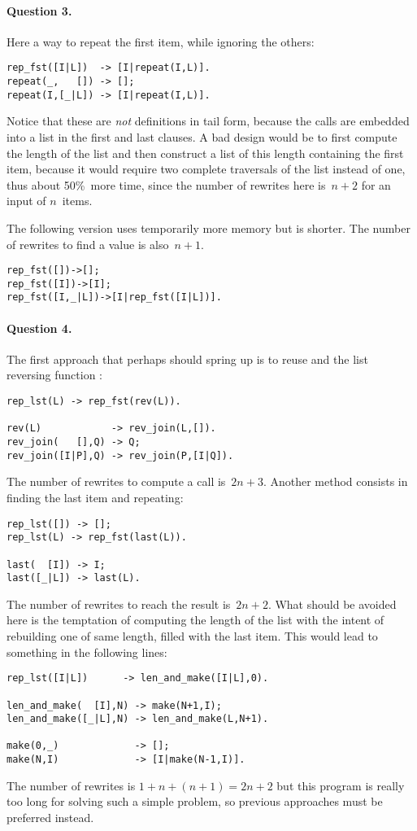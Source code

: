 \medskip

\paragraph{Question 3.}

Here a way to repeat the first item, while ignoring the others:
\begin{verbatim}
rep_fst([I|L])  -> [I|repeat(I,L)].
repeat(_,   []) -> [];
repeat(I,[_|L]) -> [I|repeat(I,L)].
\end{verbatim}
Notice that these are \emph{not} definitions in tail form, because the
calls  are embedded into a list in the first and
last clauses. A bad design would be to first compute the length of the
list and then construct a list of this length containing the first
item, because it would require two complete traversals of the list
instead of one, thus about 50\%~more time, since the number of
rewrites here is~\(n+2\) for an input of \(n\)~items.

The following version uses temporarily more memory but is shorter.
The number of rewrites to find a value is also~\(n+1\).
\begin{alltt}
rep_fst(     []) -> [];
rep_fst(    [I]) -> [I];
rep_fst([I,_|L]) -> [I|rep_fst([I|L])].\hfill% \emph{Two} | \emph{instead of 1}
\end{alltt}

\medskip

\paragraph{Question 4.}

The first approach that perhaps should spring up is to reuse
 and the list reversing function :
\begin{verbatim}
rep_lst(L) -> rep_fst(rev(L)).

rev(L)            -> rev_join(L,[]).
rev_join(   [],Q) -> Q;
rev_join([I|P],Q) -> rev_join(P,[I|Q]).
\end{verbatim}
The number of rewrites to compute a call is~\(2n+3\). Another method
consists in finding the last item and repeating:
\begin{verbatim}
rep_lst([]) -> [];
rep_lst(L) -> rep_fst(last(L)).

last(  [I]) -> I;
last([_|L]) -> last(L).
\end{verbatim}
The number of rewrites to reach the result is~\(2n+2\). What should be
avoided here is the temptation of computing the length of the list
with the intent of rebuilding one of same length, filled with the last
item. This would lead to something in the following lines:
\begin{verbatim}
rep_lst([I|L])      -> len_and_make([I|L],0).

len_and_make(  [I],N) -> make(N+1,I);
len_and_make([_|L],N) -> len_and_make(L,N+1).

make(0,_)             -> [];
make(N,I)             -> [I|make(N-1,I)].
\end{verbatim}
The number of rewrites is \(1 + n + (n+1) = 2n+2\) but this program is
really too long for solving such a simple problem, so previous
approaches must be preferred instead.

